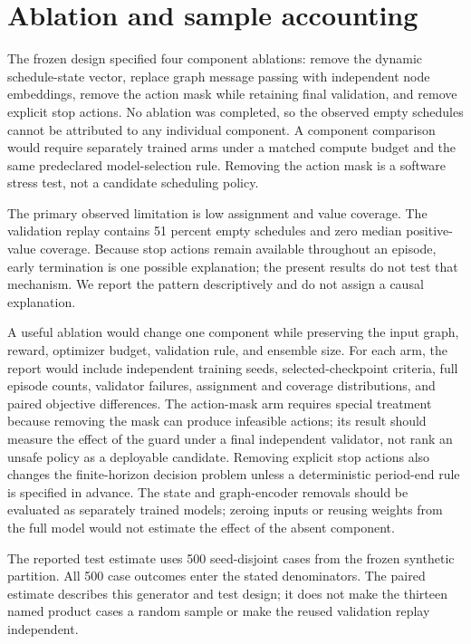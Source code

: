 \documentclass[11pt]{article}
\begin{document}
\section{Ablation and sample accounting}
The frozen design specified four component ablations: remove the dynamic schedule-state vector, replace graph message passing with independent node embeddings, remove the action mask while retaining final validation, and remove explicit stop actions. No ablation was completed, so the observed empty schedules cannot be attributed to any individual component. A component comparison would require separately trained arms under a matched compute budget and the same predeclared model-selection rule. Removing the action mask is a software stress test, not a candidate scheduling policy.

The primary observed limitation is low assignment and value coverage. The validation replay contains 51 percent empty schedules and zero median positive-value coverage. Because stop actions remain available throughout an episode, early termination is one possible explanation; the present results do not test that mechanism. We report the pattern descriptively and do not assign a causal explanation.

A useful ablation would change one component while preserving the input graph, reward, optimizer budget, validation rule, and ensemble size. For each arm, the report would include independent training seeds, selected-checkpoint criteria, full episode counts, validator failures, assignment and coverage distributions, and paired objective differences. The action-mask arm requires special treatment because removing the mask can produce infeasible actions; its result should measure the effect of the guard under a final independent validator, not rank an unsafe policy as a deployable candidate. Removing explicit stop actions also changes the finite-horizon decision problem unless a deterministic period-end rule is specified in advance. The state and graph-encoder removals should be evaluated as separately trained models; zeroing inputs or reusing weights from the full model would not estimate the effect of the absent component.

The reported test estimate uses 500 seed-disjoint cases from the frozen synthetic partition. All 500 case outcomes enter the stated denominators. The paired estimate describes this generator and test design; it does not make the thirteen named product cases a random sample or make the reused validation replay independent.
\end{document}
